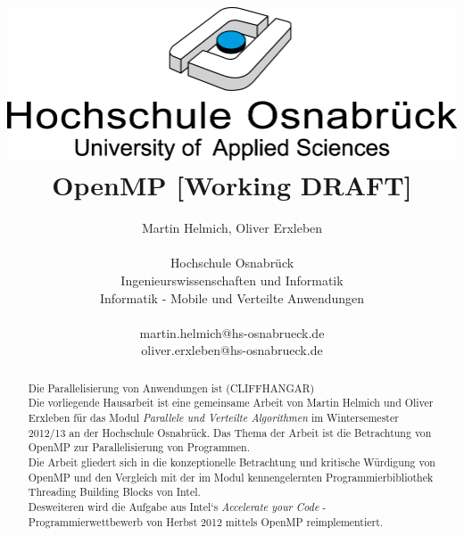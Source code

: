 \documentclass{scrartcl}
\begin{document}
\author{
	Martin Helmich, Oliver Erxleben \\ 
	\\ 
	Hochschule Osnabrück \\ 
	Ingenieurswissenschaften und Informatik \\ 
	Informatik - Mobile und Verteilte Anwendungen \\ 
	\\ 
	martin.helmich@hs-osnabrueck.de \\
	oliver.erxleben@hs-osnabrueck.de
}

\title{\includegraphics[scale=0.75,keepaspectratio]{img/hs_os.png}\linebreak \linebreak OpenMP [Working DRAFT]}

\maketitle

\tableofcontents

\begin{abstract}
Die Parallelisierung von Anwendungen ist (CLIFFHANGAR)\\
Die vorliegende Hausarbeit ist eine gemeinsame Arbeit von Martin Helmich und Oliver Erxleben für das Modul \textit{Parallele und Verteilte Algorithmen} im Wintersemester 2012/13 an der Hochschule Osnabrück. Das Thema der Arbeit ist die Betrachtung von OpenMP zur Parallelisierung von Programmen. \\ 
Die Arbeit gliedert sich in die konzeptionelle Betrachtung und kritische Würdigung von OpenMP und den Vergleich mit der im Modul kennengelernten Programmierbibliothek Threading Building Blocks von Intel. \\
Desweiteren wird die Aufgabe aus Intel`s \textit{Accelerate your Code} - Programmierwettbewerb von Herbst 2012 mittels OpenMP reimplementiert.
\end{abstract}

\pagebreak %
\end{document}
